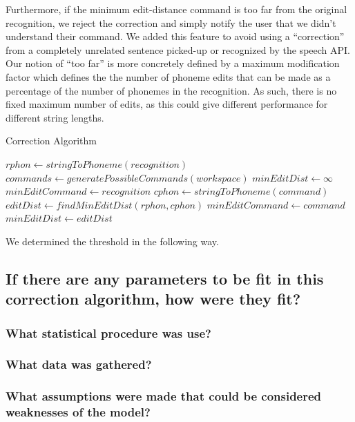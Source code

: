 \documentclass[]{article}
\begin{document}
Furthermore, if the minimum edit-distance command is too far from the original recognition, we reject the correction and simply notify the user that we didn't understand their command. We added this feature to avoid using a ``correction'' from a completely unrelated sentence picked-up or recognized by the speech API. Our notion of ``too far'' is more concretely defined by a maximum modification factor which defines the the number of phoneme edits that can be made as a percentage of the number of phonemes in the recognition. As such, there is no fixed maximum number of edits, as this could give different performance for different string lengths. 
\begin{algorithm}
	\caption{Correction Algorithm}\label{CorrectionAlgorithm}
	\begin{algorithmic}[1]
		\State $rphon \leftarrow stringToPhoneme(recognition)$
		\State $commands\leftarrow generatePossibleCommands(workspace) $
		\State $minEditDist \leftarrow \infty$
		\State $minEditCommand \leftarrow recognition$
			\State $cphon \leftarrow stringToPhoneme(command)$
			\State $editDist \leftarrow findMinEditDist(rphon, cphon)$
				\State $minEditCommand \leftarrow command$
				\State $minEditDist \leftarrow editDist$
			\EndIf
		\EndFor
			\State {}
		\Else
			\State {}
		\EndIf
		\State {}
		\EndProcedure
	\end{algorithmic}
\end{algorithm}

We determined the threshold in the following way.

\subsection{If there are any parameters to be fit in this correction algorithm, how were they fit?}
\subsubsection{What statistical procedure was use?}
\subsubsection{What data was gathered?}
\subsubsection{What assumptions were made that could be considered weaknesses of the model?}
\end{document}
